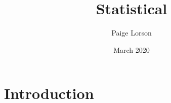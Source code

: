 \documentclass{article}
\title{Statistical}
\author{Paige Lorson}
\date{March 2020}
\begin{document}
\maketitle

\section{Introduction}
\end{document}
